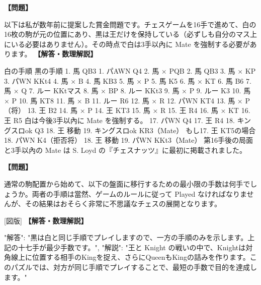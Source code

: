 \documentclass[10pt,a4paper,oneside,openany]{ltjsbook}
\begin{document}
\begin{tcolorbox}[colback=softblue,colframe=primaryblue,title=\textbf{第 351 問：十字軍遠徵者 （原題: THE CRUSADER.）},arc=2mm,boxrule=1pt,breakable]
\textbf{【問題】}\par\vspace{0.3em}
以下は私が数年前に提案した賞金問題です。チェスゲームを16手で進めて、白の16枚の駒が元の位置にあり、黒は王だけを保持している（必ずしも自分のマス上にいる必要はありません）。その時点で白は3手以內に Mate を強制する必要があります。
\tcblower
\textbf{【解答・数理解説】}\par\vspace{0.3em}
白の手順                    黒の手順
1. 馬 QB3                   1. パAWN Q4
2. 馬 × PQB                 2. 馬 QB3
3. 馬 × KP                  3. パWN KKt4
4. 馬 × B                   4. 馬 KB3
5. 馬 × P                   5. 馬 K5
6. 馬 × KT                  6. 馬 B6
7. 馬 × Q                   7. ルー KKtマス
8. 馬 × BP                  8. ルー KKt3
9. 馬 × P                   9. ルー K3
10. 馬 × P                  10. 馬 KT8
11. 馬 × B                  11. ルー R6
12. 馬 × R                  12. パWN KT4
13. 馬 × P（将）             13. 王 B2
14. 馬 × P                  14. 王 KT3
15. 馬 × R                  15. 王 R4
16. 馬 × KT                 16. 王 R5
白は今後3手以內に Mate を強制する。
17. パWN Q4                17. 王 R4
18. キングスロok Q3        18. 王 移動
19. キングスロok KR3（Mate）
もし17. 王 KT5の場合
18. パWN K4（拒否将）      18. 王 移動
19. パWN KKt3（Mate）
第16手後の局面と3手以內の Mate は S. Loyd の『チェスナッツ』に最初に掲載されました。
\end{tcolorbox}

\begin{tcolorbox}[colback=softblue,colframe=primaryblue,title=\textbf{第 352 問：IMMOVABLE PAWNS.},arc=2mm,boxrule=1pt,breakable]
\textbf{【問題】}\par\vspace{0.3em}
通常の駒配置から始めて、以下の盤面に移行するための最小限の手数は何手でしょうか。両者の手順は當然、ゲームのルールに従って Played なければなりませんが、その結果はおそらく非常に不思議なチェスの展開となります。

[図版]
\tcblower
\textbf{【解答・数理解説】}\par\vspace{0.3em}
{
  "解答": "黒は白と同じ手順でプレイしますので、一方の手順のみを示します。上記の十七手が最少手数です。",
  "解説": "王と Knight の戦いの中で、Knightは対角線上に位置する相手のKingを捉え、さらにQueenもKingの詰みを作ります。このパズルでは、対方が同じ手順でプレイすることで、最短の手数で目的を達成します。"
}
\end{tcolorbox}
\end{document}
